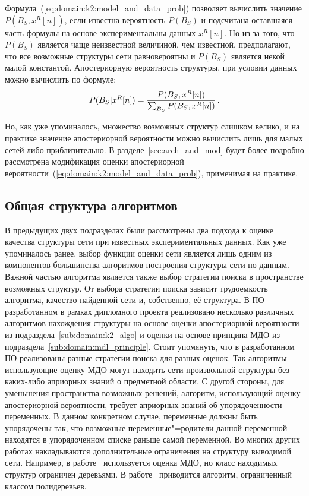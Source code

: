 Формула~(\ref{eq:domain:k2:model_and_data_prob}) позволяет вычислить значение $P(B_S, x^R[n])$, если известна вероятность $P(B_S)$ и подсчитана оставшаяся часть формулы на основе экспериментальны данных $x^R[n]$.
Но из-за того, что $P(B_S)$ является чаще неизвестной величиной, чем известной, предполагают, что все возможные структуры сети равновероятны и $P(B_S)$ является некой малой константой.
Апостериорную вероятность структуры, при условии данных можно вычислить по формуле:
\begin{equation}
  \label{eq:domain:k2:aposteriori_structure_given_data}
  P(B_S | x^R[n]) = 
    \frac{P(B_S, x^R[n])}
         {\sum_{B_S}P(B_S, x^R[n])} \text{\,.}
\end{equation}

Но, как уже упоминалось, множество возможных структур слишком велико, и на практике значение апостериорной вероятности можно вычислить лишь для малых сетей либо приблизительно. 
В разделе~\ref{sec:arch_and_mod} будет более подробно рассмотрена модификация оценки апостериорной вероятности~(\ref{eq:domain:k2:model_and_data_prob}), применимая на практике.


\subsection{Общая структура алгоритмов}
\label{sub:domain:other_algos}
В предыдущих двух подразделах были рассмотрены два подхода к оценке качества структуры сети при известных экспериментальных данных.
Как уже упоминалось ранее, выбор функции оценки сети является лишь одним из компонентов большинства алгоритмов построения структуры сети по данным.
Важной частью алгоритма является также выбор стратегии поиска в пространстве возможных структур.
От выбора стратегии поиска зависит трудоемкость алгоритма, качество найденной сети и, собственно, её структура.
В ПО разработанном в рамках дипломного проекта реализовано несколько различных алгоритмов нахождения структуры на основе оценки апостериорной вероятности из подраздела~\ref{sub:domain:k2_algo} и оценки на основе принципа МДО из подраздела~\ref{sub:domain:mdl_principle}.
Стоит упомянуть, что в разработанном ПО реализованы разные стратегии поиска для разных оценок. 
Так алгоритмы использующие оценку МДО могут находить сети произвольной структуры без каких-либо априорных знаний о предметной области.
С другой стороны, для уменьшения пространства возможных решений, алгоритм, использующий оценку апостериорной вероятности, требует априорных знаний об упорядоченности переменных.
В данном конкретном случае, переменные должны быть упорядочены так, что возможные переменные"=родители данной переменной находятся в упорядоченном списке раньше самой переменной.
Во многих других работах накладываются дополнительные ограничения на структуру выводимой сети.
Например, в работе~\cite{Suzuki93} используется оценка МДО, но класс находимых структур ограничен деревьями.
В работе~\cite{Rebane87} приводится алгоритм, ограниченный классом полидеревьев.

